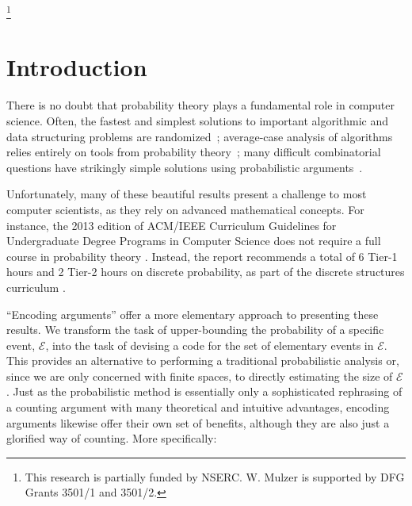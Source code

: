 \documentclass[format=acmsmall, review=false, screen=true]{acmart}
\begin{document}



\thanks{This research is partially funded by NSERC.
W. Mulzer is supported by DFG Grants 3501/1 and 3501/2.
}

\maketitle

\section{Introduction}

There is no doubt that probability theory plays a fundamental role in
computer science. Often, the fastest and simplest solutions to important
algorithmic and data structuring problems are randomized~\cite{mitzenmacher.upfal:probability,motwani.raghavan:randomized}; 
average-case analysis of algorithms relies entirely on tools from probability 
theory~\cite{flajolet.sedgewick:aofa}; 
many difficult combinatorial questions have strikingly simple
solutions using probabilistic arguments~\cite{alon:probabilistic}.

Unfortunately, many of these beautiful results 
present a challenge to
most computer scientists, as they rely on
advanced mathematical concepts.
For instance, the 2013 edition of ACM/IEEE Curriculum
Guidelines for Undergraduate Degree Programs in Computer Science does
not require a full course in probability theory
\cite[Page~50]{computing-curricula:computer}. Instead, the report
recommends a total of 6 Tier-1 hours and 2 Tier-2 hours on
discrete probability, as part of the discrete structures curriculum
\cite[Page~77]{computing-curricula:computer}.

``Encoding arguments'' offer a more elementary 
approach to presenting these results.
We transform the
task of upper-bounding the probability of a specific event,
$\mathcal{E}$, into the task of devising a code for the set of
elementary events in $\mathcal{E}$. This provides an alternative
to performing a traditional probabilistic analysis or, since we are
only concerned with finite spaces, to directly estimating the size of
$\mathcal{E}$. Just as the probabilistic method
is essentially only a sophisticated rephrasing of a counting argument
with many theoretical and intuitive advantages,
encoding arguments likewise
offer their own set of benefits,
although they are also just a glorified way of counting. More
specifically:
\end{document}
